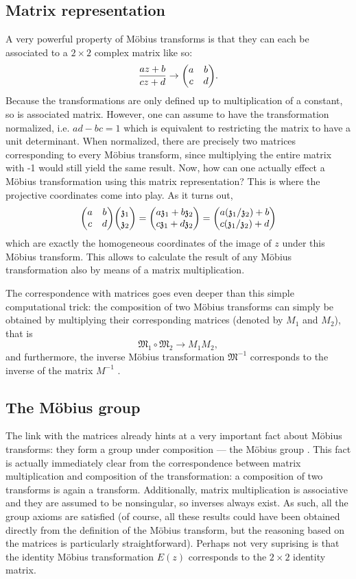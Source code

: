 \subsection{Matrix representation}
A very powerful property of Möbius transforms is that they can each be associated to a \(2\times 2\) complex matrix like so:
\[ \frac{az + b}{cz + d} \rightarrow \mqty(a & b \\ c & d).\] 
Because the transformations are only defined up to multiplication of a constant, so is associated matrix. However, one can assume to have the transformation normalized, i.e. \(ad - bc = 1\) which is equivalent to restricting the matrix to have a unit determinant.  When normalized, there are precisely two matrices corresponding to every Möbius transform, since multiplying the entire matrix with -1 would still yield the same result. Now, how can one actually effect a Möbius transformation using this matrix representation? This is where the projective coordinates come into play. As it turns out, 
\[ 
    \mqty(a & b\\ c & d)\mqty(\mathfrak{z}_1\\\mathfrak{z}_2)
    = \mqty(a\mathfrak{z}_1 + b\mathfrak{z}_2\\c\mathfrak{z}_1 + d\mathfrak{z}_2)
    =\mqty(a(\mathfrak{z}_1/\mathfrak{z}_2) + b\\c(\mathfrak{z}_1/\mathfrak{z}_2) + d)
\]
which are exactly the homogeneous coordinates of the image of \(z\) under this Möbius transform. This allows to calculate the result of any Möbius transformation also by means of a matrix multiplication.

The correspondence with matrices goes even deeper than this simple computational trick: the composition of two Möbius transforms  can simply be obtained by multiplying their corresponding matrices (denoted by \(M_1\) and \(M_2\)), that is
\[\mathfrak{M}_1 \circ \mathfrak{M}_2 \to M_1 M_2,\]
and furthermore, the inverse Möbius transformation \(\mathfrak{M}^{-1}\) corresponds to the inverse of the matrix \(M^{-1}\) \cite{Needham2021}.


\subsection{The Möbius group} 
The link with the matrices already hints at a very important fact about Möbius transforms: they form a group under composition --- the Möbius group \moebiusgroup. This fact is actually immediately clear from the correspondence between matrix multiplication and composition of the transformation: a composition of two transforms is again a transform. Additionally, matrix multiplication is associative and they are assumed to be nonsingular, so inverses always exist. As such, all the group axioms are satisfied (of course, all these results could have been obtained directly from the definition of the Möbius transform, but the reasoning based on the matrices is particularly straightforward). Perhaps not very suprising is that the identity Möbius transformation \(E(z)\) corresponds to the \(2\times 2\) identity matrix.

